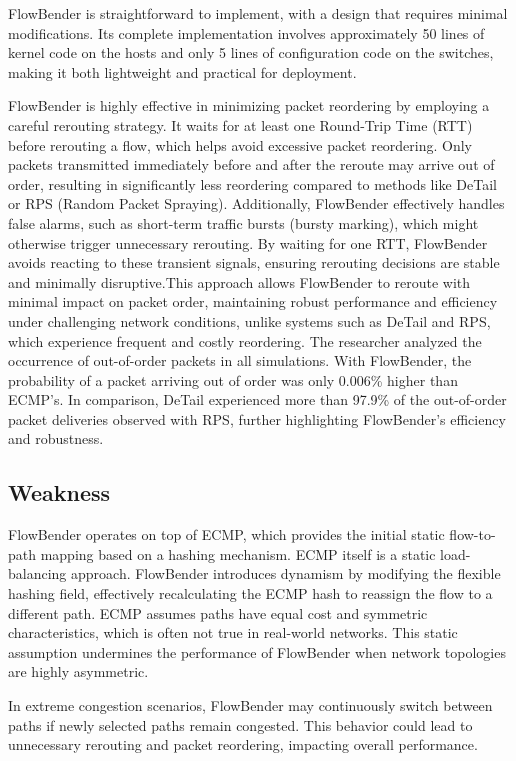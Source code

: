 \documentclass[11pt, sigplan]{acmart}
\begin{document}
FlowBender is straightforward to implement, with a design that requires minimal modifications. Its complete implementation involves approximately 50 lines of kernel code on the hosts and only 5 lines of configuration code on the switches, making it both lightweight and practical for deployment.

FlowBender is highly effective in minimizing packet reordering by employing a careful rerouting strategy. It waits for at least one Round-Trip Time (RTT) before rerouting a flow, which helps avoid excessive packet reordering. Only packets transmitted immediately before and after the reroute may arrive out of order, resulting in significantly less reordering compared to methods like DeTail or RPS (Random Packet Spraying). Additionally, FlowBender effectively handles false alarms, such as short-term traffic bursts (bursty marking), which might otherwise trigger unnecessary rerouting. By waiting for one RTT, FlowBender avoids reacting to these transient signals, ensuring rerouting decisions are stable and minimally disruptive.This approach allows FlowBender to reroute with minimal impact on packet order, maintaining robust performance and efficiency under challenging network conditions, unlike systems such as DeTail and RPS, which experience frequent and costly reordering. The researcher analyzed the occurrence of out-of-order packets in all simulations. With FlowBender, the probability of a packet arriving out of order was only 0.006\% higher than ECMP’s. In comparison, DeTail experienced more than 97.9\% of the out-of-order packet deliveries observed with RPS, further highlighting FlowBender’s efficiency and robustness.

\subsection{Weakness}
FlowBender operates on top of ECMP, which provides the initial static flow-to-path mapping based on a hashing mechanism. ECMP itself is a static load-balancing approach. FlowBender introduces dynamism by modifying the flexible hashing field, effectively recalculating the ECMP hash to reassign the flow to a different path. ECMP assumes paths have equal cost and symmetric characteristics, which is often not true in real-world networks. This static assumption undermines the performance of FlowBender when network topologies are highly asymmetric.

In extreme congestion scenarios, FlowBender may continuously switch between paths if newly selected paths remain congested. This behavior could lead to unnecessary rerouting and packet reordering, impacting overall performance.
\end{document}
